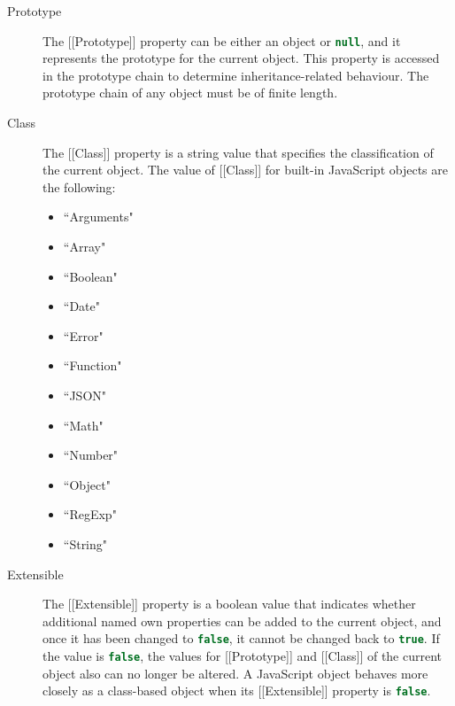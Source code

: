 \documentclass[a4paper,11pt,twoside]{report}
\def\jsinline{\lstinline[language=JavaScript, basicstyle=\small]}%\end{lstlisting}
\begin{document}
\begin{description}
\item[Prototype] The [[Prototype]] property can be either an object or \jsinline|null|, and it represents the prototype for the current object. This property is accessed in the prototype chain to determine inheritance-related behaviour. The prototype chain of any object must be of finite length. 

\item[Class] The [[Class]] property is a string value that specifies the classification of the current object. The value of [[Class]] for built-in JavaScript objects are the following:
\begin{multicols}{3}
\begin{itemize}
	\item ``Arguments"
	\item ``Array"
	\item ``Boolean"
	\item ``Date"
	\item ``Error"
	\item ``Function"
	\item ``JSON"
	\item ``Math"
	\item ``Number"
	\item ``Object"
	\item ``RegExp"
	\item ``String"
\end{itemize}
\end{multicols}

\item[Extensible] The [[Extensible]] property is a boolean value that indicates whether additional named own properties can be added to the current object, and once it has been changed to \jsinline|false|, it cannot be changed back to \jsinline|true|. If the value is \jsinline|false|, the values for [[Prototype]] and [[Class]] of the current object also can no longer be altered. A JavaScript object behaves more closely as a class-based object when its [[Extensible]] property is \jsinline|false|.
\end{description}
\end{document}
